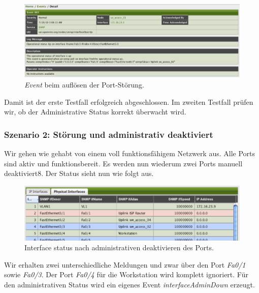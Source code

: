 \begin{figure}[H]
	\centering
	\includegraphics[width=1.0\textwidth]{images/use-cases/monitoring-layer-2/port-up-event}
	\caption{\emph{Event} beim auflösen der Port-Störung.}
	\label{pic:port-up-event}
\end{figure}

Damit ist der erste Testfall erfolgreich abgeschlossen. Im zweiten Testfall prüfen wir, ob der Administrative Status korrekt überwacht wird.

\subsubsection{Szenario 2: Störung und administrativ deaktiviert}
Wir gehen wie gehabt von einem voll funktionsfähigem Netzwerk aus. Alle Ports sind aktiv und funktionsbereit. Es werden nun wiederum zwei Ports manuell deaktiviert8. Der Status sieht nun wie folgt aus.

\begin{figure}[H]
	\centering
	\includegraphics[width=1.0\textwidth]{images/use-cases/monitoring-layer-2/port-admin-down}
	\caption{Interface status nach administrativen deaktivieren des Ports.}
	\label{pic:port-admin-down}
\end{figure}

Wir erhalten zwei unterschiedliche Meldungen und zwar über den Port \emph{Fa0/1} sowie \emph{Fa0/3}. Der Port \emph{Fa0/4} für die Workstation wird komplett ignoriert. Für den administrativen Status wird ein eigenes Event \emph{interfaceAdminDown} erzeugt.

